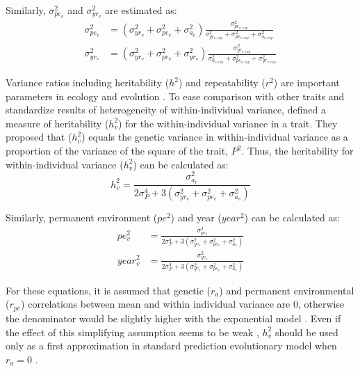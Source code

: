 \documentclass[a4paper,12pt,twoside]{article}
\begin{document}
	Similarly, $\sigma_{pe_v}^2$ and $\sigma_{yr_v}^2$ are estimated as:
	\begin{align}
		\sigma_{pe_v}^2 &= (\sigma_{yr_v}^2 + \sigma_{pe_v}^2 + \sigma_{a_v}^2 ) \frac{\sigma_{pe_{v,exp}}^2}{\sigma_{yr_{v,exp}}^2 + \sigma_{pe_{v,exp}}^2 + \sigma_{a_{v,exp}}^2}\\
		\sigma_{yr_v}^2 &= (\sigma_{yr_v}^2 + \sigma_{pe_v}^2 + \sigma_{yr_v}^2 ) \frac{\sigma_{yr_{v,exp}}^2}{\sigma_{a_{v,exp}}^2 + \sigma_{pe_{v,exp}}^2 + \sigma_{yr_{v,exp}}^2}
	\end{align}
	
	Variance ratios including heritability ($h^2$) and repeatability ($r^2$) are important parameters in ecology and evolution \citep{lynch_genetics_1998,roff_life_2002}. 
	To ease comparison with other traits and standardize results of heterogeneity of within-individual variance, \cite{mulder_prediction_2007} defined a measure of heritability ($h_v^2$) for the within-individual variance in a trait.
	They proposed that ($h_v^2$) equals the genetic variance in within-individual variance as a proportion of the variance of the square of the trait, $P^2$.
	Thus, the heritability for within-individual variance ($h_v^2$) can be calculated as:
	\begin{equation}
		h_v^2 = \frac{\sigma_{a_v}^2}{2\sigma_P^4+3(\sigma_{yr_v}^2+ \sigma_{pe_v}^2 + \sigma_{a_v}^2)}
	\end{equation}
	
	Similarly, permanent environment ($pe^2$) and year ($year^2$) can be calculated as:
	\begin{align}
		pe_v^2 &= \frac{\sigma_{pe_v}^2}{2\sigma_P^4+3(\sigma_{yr_v}^2+ \sigma_{pe_v}^2 + \sigma_{a_v}^2)}\\
		year_v^2 &= \frac{\sigma_{yr_v}^2}{2\sigma_P^4+3(\sigma_{yr_v}^2+ \sigma_{pe_v}^2 + \sigma_{a_v}^2)}
	\end{align}
	
	For these equations, it is assumed that genetic ($r_a$) and permanent environmental ($r_{pe}$) correlations between mean and within individual variance are 0, otherwise the denominator would be slightly higher with the exponential model \citep{mulder_prediction_2007}.
	Even if the effect of this simplifying assumption seems to be weak \citep{mulder_prediction_2007,sae-lim_genetic_2015}, $h_v^2$ should be used only as a first approximation in standard prediction evolutionary model when $r_a=0$ .

	
\end{document}
